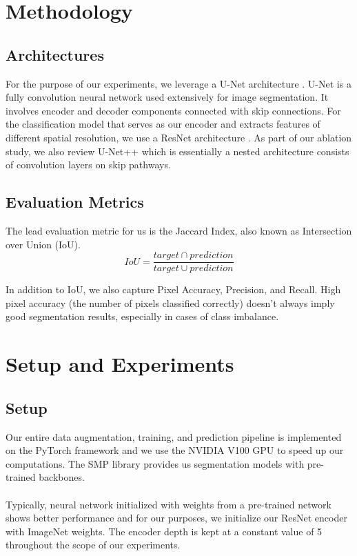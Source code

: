 \documentclass[conference]{IEEEtran}
\begin{document}
\section{Methodology}
\subsection{Architectures}

For the purpose of our experiments, we leverage a U-Net architecture \cite{ronneberger2015unet}. U-Net is a fully convolution neural network used extensively for image segmentation. It involves encoder and decoder components connected with skip connections. For the classification model that serves as our encoder and extracts features of different spatial resolution, we use a ResNet architecture \cite{DBLP:journals/corr/HeZRS15}. As part of our ablation study, we also review U-Net++ \cite{DBLP:journals/corr/abs-1807-10165} which is essentially a nested architecture consists of convolution layers on skip pathways.

\subsection{Evaluation Metrics}
 The lead evaluation metric for us is the Jaccard Index, also known as Intersection over Union (IoU).
\begin{equation*}
    IoU=\frac{target \cap prediction}{target \cup prediction}
\end{equation*}

In addition to IoU, we also capture Pixel Accuracy, Precision, and Recall. High pixel accuracy (the number of pixels classified correctly) doesn't always imply good segmentation results, especially in cases of class imbalance. 

\section{Setup and Experiments}

\subsection{Setup}
Our entire data augmentation, training, and prediction pipeline is implemented on the PyTorch framework and we use the NVIDIA V100 GPU to speed up our computations. The SMP library \cite{Yakubovskiy:2019} provides us segmentation models with pre-trained backbones. 
\\
\\Typically, neural network initialized with weights from a pre-trained network shows better performance and for our purposes, we initialize our ResNet encoder with ImageNet weights. The encoder depth is kept at a constant value of 5 throughout the scope of our experiments. 
\end{document}

